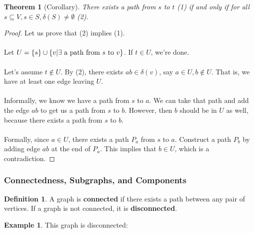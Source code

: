 \documentclass[]{article}
\newtheorem*{theorem}{Theorem}
\theoremstyle{definition}
\newtheorem*{defn}{Definition}
\newtheorem{ex}{Example}[section]
\newcommand{\lecture}[1]{\marginpar{{\footnotesize $\leftarrow$ \underline{#1}}}}
\DeclarePairedDelimiter{\set}{\lbrace}{\rbrace}
\begin{document}
				\begin{theorem}[Corollary] \lecture{March 4, 2013}
					There exists a path from $s$ to $t$ (1) if and only if for all $s \subseteq V, s \in S, \delta(S) \ne \emptyset$ (2).
				\end{theorem}

				\begin{proof}
					Let us prove that (2) implies (1).
					\\ \\
					Let $U = \set{s} \cup \set{v | \exists \text{ a path from } s \text{ to } v}$. If $t \in U$, we're done. 
					\\ \\
					Let's assume $t \not \in U$. By (2), there exists $ab \in \delta(v)$, say $a \in U, b \not \in U$. That is, we have at least one edge leaving $U$.
					\\ \\
					Informally, we know we have a path from $s$ to $a$. We can take that path and add the edge $ab$ to get us a path from $s$ to $b$. However, then $b$ should be in $U$ as well, because there exists a path from $s$ to $b$.
					\\ \\
					Formally, since $a \in U$, there exists a path $P_a$ from $s$ to $a$. Construct a path $P_b$ by adding edge $ab$ at the end of $P_a$. This implies that $b \in U$, which is a contradiction.
				\end{proof}

			\subsubsection{Connectedness, Subgraphs, and Components}
				\begin{defn}
					A graph is \textbf{connected} if there exists a path between any pair of vertices. If a graph is not connected, it is \textbf{disconnected}.
				\end{defn}
				
				\begin{ex}
					This graph is disconnected:
					\begin{center}
					\end{center}
				\end{ex}
\end{document}
